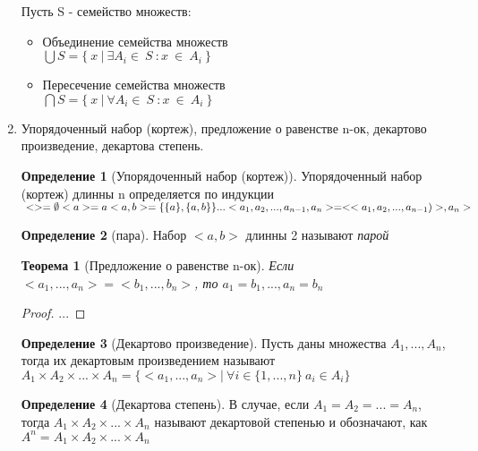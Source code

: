 \documentclass{article}
\newtheorem*{theorem*}{Теорема}
\theoremstyle{definition}
\newtheorem*{definition*}{Определение}
\begin{document}
\begin{enumerate}
\begin{itemize}
      \end{itemize}\newpage
      Пусть S - семейство множеств:
      \begin{itemize}
        \item Объединение семейства множеств\\
        $\bigcup{S} = \{\ x\ |\ \exists{A_i} \in{\ S \ }:x\ \in{\ A_i \ }\}$
        \item Пересечение семейства множеств\\
        $\bigcap{S} = \{\ x\ |\ \forall{A_i} \in{\ S\ }: x\ \in{\ A_i \ } \}$
      \end{itemize}
    \item Упорядоченный набор (кортеж), предложение о равенстве n-ок, декартово произведение, декартова степень.
    \begin{definition*}[Упорядоченный набор (кортеж)]
      Упорядоченный набор (кортеж) длинны n определяется по индукции
      \begin{math}\\
        <> = \emptyset\\
        <a> = a\\
        <a,b> = \{\{a\},\{a,b\}\}
        \\
        ...
        \\
        <a_1, a_2, ...,a_{n-1} ,a_n> = <<a_1, a_2, ...,a_{n-1})>, a_n>
      \end{math}
    \end{definition*}
    \begin{definition*}[пара]
        Набор $<a,b>$ длинны 2 называют \textit{парой}
    \end{definition*}
    \begin{theorem*}[Предложение о равенстве n-ок]
      Если \mbox{$<a_1,...,a_n> = <b_1, ..., b_n>$}, то $a_1 = b_1, ..., a_n = b_n$
    \end{theorem*}
    \begin{proof}
        ...
    \end{proof}
    \begin{definition*}[Декартово произведение]
      Пусть даны множества $A_1,...,A_n$, тогда их декартовым произведением называют
      \newline\mbox{$A_1 \times A_2 \times ... \times A_n = \{<a_1,...,a_n>|\  \forall{i}\in{\{1,...,n\}}\ a_i\in{A_i} \}$}
    \end{definition*}
    \begin{definition*}[Декартова степень]
      В случае, если \mbox{$A_1=A_2=...=A_n$}, тогда $A_1 \times A_2 \times ... \times A_n$ называют декартовой степенью и обозначают, как $A^n=A_1 \times A_2 \times ... \times A_n$

\end{definition*}
\end{enumerate}
\end{document}
